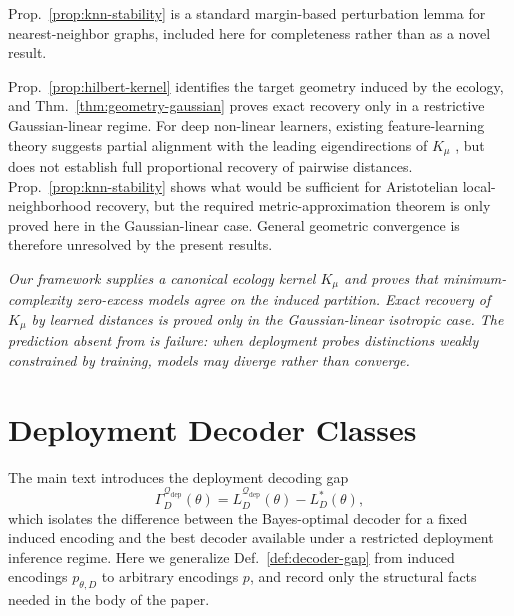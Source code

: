 \documentclass[twoside,11pt]{article}
\newenvironment{interpretation}{\par\noindent{\bf Interpretation.}\itshape}{\par}
\newcommand{\thmref}[1]{Thm.~\ref{#1}}
\newcommand{\propref}[1]{Prop.~\ref{#1}}
\newcommand{\defref}[1]{Def.~\ref{#1}}
\begin{document}
\begin{remark}[Status]
\propref{prop:knn-stability} is a standard margin-based perturbation lemma for nearest-neighbor graphs, included here for completeness rather than as a novel result.
\end{remark}

\begin{remark}
\propref{prop:hilbert-kernel} identifies the target geometry induced by the ecology, and \thmref{thm:geometry-gaussian} proves exact recovery only in a restrictive Gaussian-linear regime. For deep non-linear learners, existing feature-learning theory suggests partial alignment with the leading eigendirections of $K_\mu$ \citep{ba_etal_2022,atanasov_etal_2022,damian_etal_2022}, but does not establish full proportional recovery of pairwise distances. \propref{prop:knn-stability} shows what would be sufficient for Aristotelian local-neighborhood recovery, but the required metric-approximation theorem is only proved here in the Gaussian-linear case. General geometric convergence is therefore unresolved by the present results.
\end{remark}

\begin{interpretation}
Our framework supplies a canonical ecology kernel $K_\mu$ and proves that minimum-complexity zero-excess models agree on the induced partition. Exact recovery of $K_\mu$ by learned distances is proved only in the Gaussian-linear isotropic case. The prediction absent from \citet{huh_etal_2024} is \emph{failure}: when deployment probes distinctions weakly constrained by training, models may diverge rather than converge.
\end{interpretation}

\section{Deployment Decoder Classes}\label{app:decoder-gap}

The main text introduces the deployment decoding gap
\[
\Gamma_D^{\mathcal{Q}_{\mathrm{dep}}}(\theta)
= L_D^{\mathcal{Q}_{\mathrm{dep}}}(\theta)-L_D^*(\theta),
\]
which isolates the difference between the Bayes-optimal decoder for a fixed induced encoding and the best decoder available under a restricted deployment inference regime. Here we generalize \defref{def:decoder-gap} from induced encodings $p_{\theta,D}$ to arbitrary encodings $p$, and record only the structural facts needed in the body of the paper.
\end{document}
